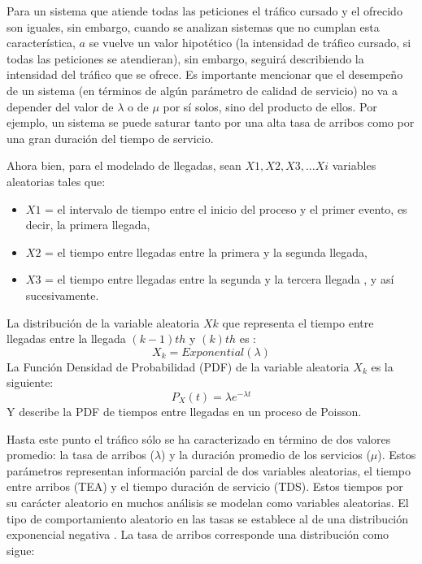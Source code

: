 Para un sistema que atiende todas las peticiones el tráfico cursado y el ofrecido son iguales, sin embargo, cuando se analizan sistemas que no cumplan esta característica, $a$ se vuelve un valor hipotético (la intensidad de tráfico cursado, si todas las peticiones se atendieran), sin embargo, seguirá describiendo la intensidad del tráfico que se ofrece. Es importante mencionar que el desempeño de un sistema (en términos de algún parámetro de calidad de servicio) no va a depender del valor de $\lambda$ o de $\mu$ por sí solos, sino del producto de ellos. Por ejemplo, un sistema se puede saturar tanto por una alta tasa de arribos como por una gran duración del tiempo de servicio.\newline

Ahora bien, para el modelado de llegadas, sean $X1, X2, X3, ... Xi$ variables aleatorias tales que:
\begin{itemize}
    \item $X1$ = el intervalo de tiempo entre el inicio del proceso y el primer evento, es decir, la primera llegada,
    \item $X2$ = el tiempo entre llegadas entre la primera y la segunda llegada,
    \item $X3$ = el tiempo entre llegadas entre la segunda y la tercera llegada , y así sucesivamente.
\end{itemize}
La distribución de la variable aleatoria $Xk$ que representa el tiempo entre llegadas entre la llegada $(k-1) th$ y $(k) th$ es \parencite{PoissonMedium}:
\begin{equation}
    X_{k}=Exponential(\lambda)
    \label{eqn:expon}
\end{equation}
La Función Densidad de Probabilidad (PDF) de la variable aleatoria $X_{k}$ es la siguiente:
\begin{equation}
    P_{X}(t)=\lambda e^{-\lambda t}
    \label{eqn:pdfexpon}
\end{equation}
Y describe la PDF de tiempos entre llegadas en un proceso de Poisson.\newline

Hasta este punto el tráfico sólo se ha caracterizado en término de dos valores promedio: la tasa de arribos ($\lambda$) y la duración promedio de los servicios ($\mu$). Estos parámetros representan información parcial de dos variables aleatorias, el tiempo entre arribos (TEA) y el tiempo duración de servicio (TDS). Estos tiempos por su carácter aleatorio en muchos análisis se modelan como variables aleatorias. El tipo de comportamiento aleatorio en las tasas se establece al de una distribución exponencial negativa \parencite{Carter1990}. La tasa de arribos corresponde una distribución como sigue:

